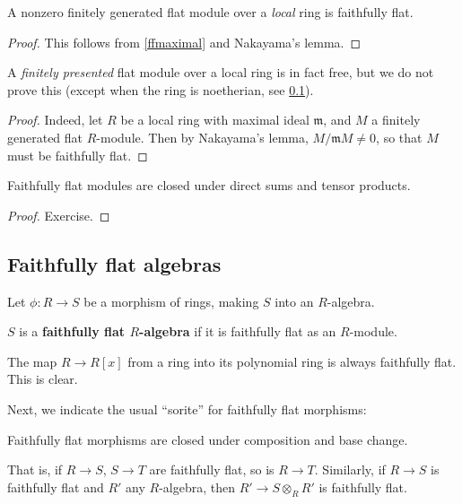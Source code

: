 \begin{corollary} 
A nonzero finitely generated flat module over a \emph{local} ring is faithfully flat.
\end{corollary} 
\begin{proof} 
This follows from \cref{ffmaximal} and Nakayama's lemma. 
\end{proof} 

A \emph{finitely presented} flat module over a local ring is in fact free, but we do not prove
this (except when the ring is noetherian, see \cref{}).
\begin{proof} 
Indeed, let $R$ be a local ring with maximal ideal $\mathfrak{m}$, and $M$ a
finitely generated flat $R$-module. Then by Nakayama's lemma, $M/\mathfrak{m}M
\neq 0$, so that $M$ must be faithfully flat.
\end{proof} 

\begin{proposition} 
Faithfully flat modules are closed under direct sums and tensor products.
\end{proposition} 

\begin{proof} 
Exercise.
\end{proof} 




\subsection{Faithfully flat algebras}

Let $\phi: R \to S$ be a morphism of rings, making $S$ into an $R$-algebra.

\begin{definition} 
$S$ is a \textbf{faithfully flat $R$-algebra} if it is faithfully flat as an
$R$-module.
\end{definition} 

\begin{example} 
The map $R \to R[x]$ from a ring into its polynomial ring is always faithfully
flat. This is clear.
\end{example}

Next, we indicate the usual ``sorite'' for faithfully flat morphisms:
\begin{proposition} \label{ffsorite}
Faithfully flat morphisms are closed under composition and base change.
\end{proposition} 
That is, if $R \to S$, $S \to T$ are faithfully flat, so is $R \to T$.
Similarly, if $R \to S$ is faithfully flat and $R'$ any $R$-algebra, then $R'
\to S \otimes_R R'$ is faithfully flat.

